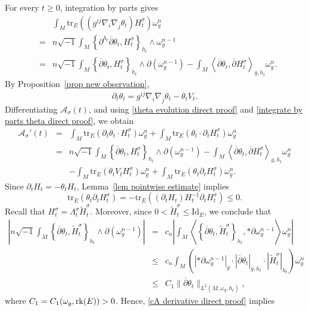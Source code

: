 \documentclass[12pt, reqno]{amsart}
\newcommand\cA{{\mathcal A}}
\newcommand{\id}{{\rm id}}
\newcommand{\rk}{{\rm rk}}
\newcommand\bp{{\bar\partial}}
\theoremstyle{plain}
\theoremstyle{definition}
\newcommand{\p}{\partial}
\renewcommand{\bar}{\overline}
\newcommand{\beq}{\begin{equation}}
\newcommand{\eeq}{\end{equation}}
\newcommand{\ee}{\end{eqnarray*}}
\newcommand{\be}{\begin{eqnarray*}}
\renewcommand{\tilde}{\widetilde}
\renewcommand{\bp}{\bar{\partial}}
\renewcommand{\>}{\rightarrow}
\newcommand{\LL}{\left\langle}
\newcommand{\RL}{\right\rangle}
\renewcommand{\>}{\rightarrow}
\renewcommand{\p}{{\partial}}
\renewcommand{\bp}{{\bar{\partial}}}
\newcommand{\om}{\omega}
\renewcommand{\bar}{\overline}
\renewcommand{\tilde}{\widetilde}
\newcommand{\tr}{\mathrm{tr}}
\renewcommand{\id}{\mathrm{Id}}
\numberwithin{equation}{section} %
\begin{document}
For every $t\geq 0$, integration by parts gives
\begin{eqnarray}
&&\int_M\tr_E\left(\left(g^{i\bar j}\nabla_i\nabla_{\bar j}\theta_t\right)
H_t^\sigma\right)\om_g^n\nonumber\\
&=&
n\sqrt{-1}\int_M
\left\{\p^{h_t}\bp\theta_t,H_t^\sigma\right\}_{h_t}
\wedge\om_g^{n-1}\nonumber\\
&=&
n\sqrt{-1}\int_M
\left\{\bp\theta_t,H_t^\sigma\right\}_{h_t}
\wedge\p\left(\om_g^{n-1}\right)
-\int_M
\LL\bp\theta_t,\bp H_t^\sigma\RL_{g,h_t}\om_g^n .
\label{integrate by parts theta direct proof}
\end{eqnarray}
By Proposition~\ref{prop new observation},
\beq
\partial_t\theta_t
=
g^{i\bar j}\nabla_i\nabla_{\bar j}\theta_t-\theta_tV_t .
\label{theta evolution direct proof}
\eeq
Differentiating $\cA_\sigma(t)$, and using \eqref{theta evolution direct proof} and
\eqref{integrate by parts theta direct proof}, we obtain
\begin{eqnarray}
\cA_\sigma'(t)&=&\int_M\tr_E\left(\p_t\theta_t\cdot H_t^\sigma\right)\om_g^n+\int_M\tr_E\left(\theta_t\cdot \p_tH_t^\sigma\right)\om_g^n\nonumber\\
&=&
n\sqrt{-1}\int_M
\left\{\bp\theta_t,H_t^\sigma\right\}_{h_t}
\wedge\p\left(\om_g^{n-1}\right)
-\int_M
\LL\bp\theta_t,\bp H_t^\sigma\RL_{g,h_t}\om_g^n
\nonumber\\
&&
-\int_M\tr_E\left(\theta_tV_tH_t^\sigma\right)\om_g^n
+\int_M\tr_E\left(\theta_t\partial_tH_t^\sigma\right)\om_g^n .
\label{cA derivative direct proof}
\end{eqnarray}
Since $\partial_tH_t=-\theta_tH_t$, Lemma~\ref{lem pointwise estimate} implies
\beq
\tr_E\left(\theta_t\partial_tH_t^\sigma\right)
=
-\tr_E\left((\partial_tH_t)H_t^{-1}\partial_tH_t^\sigma\right)\leq 0.
\eeq
Recall that $H_t^\sigma=\Lambda_t^\sigma\tilde H_t^\sigma$.
Moreover, since $0<\tilde H_t^\sigma\leq\id_E$,
we conclude that
\be
\left|
n\sqrt{-1}\int_M
\left\{\bp\theta_t,\tilde H_t^\sigma\right\}_{h_t}
\wedge \p(\om_g^{n-1})
\right|
&=&c_n\left|\int_M
\left\langle \left\{\bp\theta_t,\tilde H_t^\sigma\right\}_{h_t}, *\p\omega_g^{n-1}\right\rangle
\om_g^n\right|  \nonumber\\
&\leq&c_n\int_M\left(  \left|*\p\omega_g^{n-1}\right|_g \cdot |\bp\theta_t|_{g,h_t}\cdot |\tilde H_t^\sigma|_{h_t}\right) \om_g^n \nonumber\\
&\leq&
C_1
\|\bp\theta_t\|_{L^2(M,\omega_g, h_t)},
\label{torsion term C1 estimate}
\ee
where $C_1=C_1(\om_g,\rk(E))>0$.
Hence,
 \eqref{cA derivative direct proof}
implies
\end{document}
